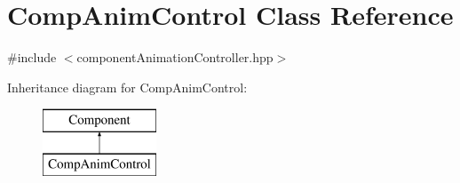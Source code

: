 \hypertarget{class_comp_anim_control}{\section{Comp\-Anim\-Control Class Reference}
\label{class_comp_anim_control}
}


{\ttfamily \#include $<$component\-Animation\-Controller.\-hpp$>$}

Inheritance diagram for Comp\-Anim\-Control\-:\begin{figure}[H]
\begin{center}
\leavevmode
\includegraphics[height=2.000000cm]{class_comp_anim_control}
\end{center}
\end{figure}
